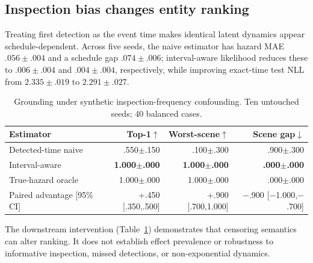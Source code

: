 \documentclass{article}
\begin{document}
\subsection{Inspection bias changes entity ranking}
Treating first detection as the event time makes identical latent dynamics appear schedule-dependent. Across five seeds, the naive estimator has hazard MAE $.056\pm.004$ and a schedule gap $.074\pm.006$; interval-aware likelihood reduces these to $.006\pm.004$ and $.004\pm.004$, respectively, while improving exact-time test NLL from $2.335\pm.019$ to $2.291\pm.027$.

\begin{table}[t]
\centering
\caption{Grounding under synthetic inspection-frequency confounding. Ten untouched seeds; 40 balanced cases.}
\label{tab:inspection}
\small
\begin{tabular}{lrrr}
\toprule
Estimator & Top-1$\uparrow$ & Worst-scene$\uparrow$ & Scene gap$\downarrow$\\
\midrule
Detected-time naive & .550$\pm$.150 & .100$\pm$.300 & .900$\pm$.300\\
Interval-aware & \textbf{1.000$\pm$.000} & \textbf{1.000$\pm$.000} & \textbf{.000$\pm$.000}\\
True-hazard oracle & 1.000$\pm$.000 & 1.000$\pm$.000 & .000$\pm$.000\\
\midrule
Paired advantage [95\% CI] & +.450 [.350,.500] & +.900 [.700,1.000] & $-$.900 [$-$1.000,$-$.700]\\
\bottomrule
\end{tabular}
\end{table}
The downstream intervention (Table~\ref{tab:inspection}) demonstrates that censoring semantics can alter ranking. It does not establish effect prevalence or robustness to informative inspection, missed detections, or non-exponential dynamics.
\end{document}
